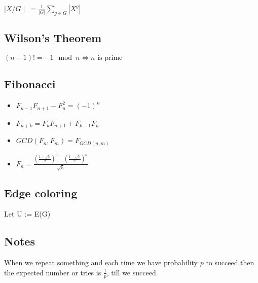 \documentclass[a4paper,10pt,oneside]{article}
\begin{document}
\begin{multicols}{2}
$\mid X / G\mid~= \frac{1}{|G|} \sum_{g \in G}{|X^g|}$

\subsection{Wilson's Theorem}
$(n-1)! = -1 \mod n \iff n\text{ is prime}$

\subsection{Fibonacci}
\begin{itemize}
\item $F_{n-1}F_{n+1} - F_n^2 = (-1)^n$
\item $F_{n+k} = F_kF_{n+1} + F_{k-1}F_n$
\item $GCD(F_n, F_m) = F_{GCD(n, m)}$
\item $F_n = \frac{(\frac{1+\sqrt{5}}{2})^n - (\frac{1-\sqrt{5}}{2})^n}{\sqrt{5}}$
\end{itemize}

\subsection{Edge coloring}

\begin{algorithm}[H]
\SetAlgoLined
{}
Let U := E(G)\;
\end{algorithm}

\subsection{Notes}
When we repeat something and each time we have probability $p$ to succeed then the expected number or tries is $\frac{1}{p}$, till we succeed.

\end{multicols}
\end{document}
